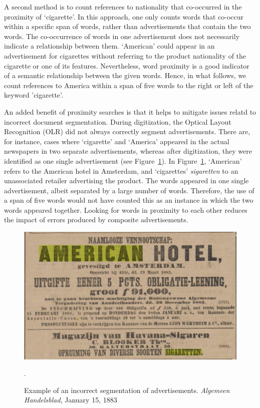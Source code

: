 \documentclass[USenglish]{article}
\begin{document}
A second method is to count references to nationality that co-occurred in the proximity of `cigarette'. In this approach, one only counts words that co-occur within a specific span of words, rather than advertisements that contain the two words. The co-occurrence of words in one advertisement does not necessarily indicate a relationship between them. `American' could appear in an advertisement for cigarettes without referring to the product nationality of the cigarette or one of its features. Nevertheless, word proximity is a good indicator of a semantic relationship between the given words. Hence, in what follows, we count references to America within a span of five words to the right or left of the keyword 'cigarette'. 

An added benefit of proximity searches is that it helps to mitigate issues relatd to incorrect document segmentation. During digitization, the Optical Layout Recognition (OLR) did not always correctly segment advertisements. There are, for instance, cases where `cigarette' and `America' appeared in the actual newspapers in two separate advertisements, whereas after digitization, they were identified as one single advertisement (see Figure~\ref{fig:segmentation}). In Figure~\ref{fig:segmentation}, `American' refers to the American hotel in Amsterdam, and `cigarettes' \textit{sigaretten} to an unassociated retailer advertising the product. The words appeared in one single advertisement, albeit separated by a large number of words. Therefore, the use of a span of five words would not have counted this as an instance in which the two words appeared together. Looking for words in proximity to each other reduces the impact of errors produced by composite advertisements.

\begin{figure}%
  \centering
  \includegraphics[width=.7\textwidth]{figures/segmentation_error}%
  \caption{Example of an incorrect segmentation of advertisements. \textit{Algemeen Handelsblad}, January 15, 1883}.%
  \label{fig:segmentation}%
\end{figure}
\end{document}
